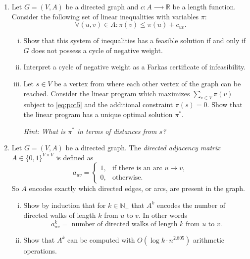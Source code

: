 \documentclass[11pt]{article}
\institute{\'Ecole Polytechnique F\'ed\'erale de Lausanne}
\begin{document}
\makeheader

\begin{enumerate}[1)]

\item \label{Ex:Node-Pot} Let $G = (V,A)$ be a directed graph and $c: A ⟶ \mathbb{R}$ be a length function. Consider the following set of linear inequalities with variables $π$:
  \begin{equation}\label{eq:pot5}
    ∀ (u,v) ∈ A: π(v) ≤ π(u) + c_{uv}. 
  \end{equation}
  \begin{enumerate}[i)]
  \item   Show that this system of inequalities has a feasible solution if and only if $G$ does not possess a cycle of negative weight.
  \item  Interpret a cycle of negative weight as a Farkas certificate of infeasibility.
  \item Let $s ∈ V$ be a vertex from where each other vertex of the graph can be reached.  Consider the linear program which maximizes $∑_{v ∈ V} π(v) $ subject to \ref{eq:pot5} and the additional constraint $π(s) = 0$. Show that the linear program has a unique optimal solution $π^*$. 
  
  \emph{Hint: What is $π^*$ in terms of distances from $s$? }
\end{enumerate}

\item \label{ex:count:paths} Let $G = (V,A)$ be a directed graph. The \emph{directed adjacency matrix} $A ∈ \{0,1\}^{V \times V}$ is  defined as 
\[
a_{uv} =
\begin{cases}
1, & \text{if there is an arc } u\to v,\\
0, & \text{otherwise.}
\end{cases}
\]
So \(A\) encodes exactly which directed edges, or arcs, are present in the graph.
\begin{enumerate}[i)] 
\item Show by induction that for  $k ∈ ℕ_+$ that  $A^k$ encodes the number of directed walks of length $k$ from $u$ to $v$. In other words
  \[
a^k_{uv} =  \text{ number of directed walks of length $k$ from $u$ to $v$.} 
\]
\item Show that $A^k$ can be computed with $O(\log k ⋅ n^{2.805})$ arithmetic operations.
\end{enumerate}


\end{enumerate}
\end{document}
